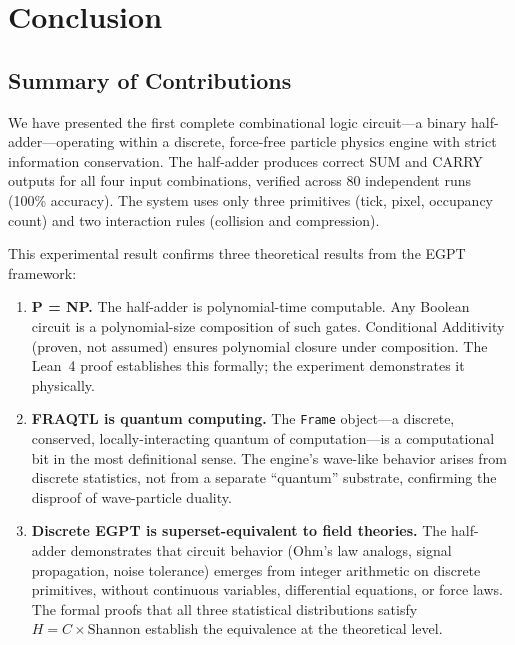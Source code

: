 \documentclass[11pt,a4paper]{article}
\begin{document}
\section{Conclusion}
\label{sec:conclusion}

\subsection{Summary of Contributions}

We have presented the first complete combinational logic circuit---a binary half-adder---operating within a discrete, force-free particle physics engine with strict information conservation. The half-adder produces correct SUM and CARRY outputs for all four input combinations, verified across 80 independent runs (100\% accuracy). The system uses only three primitives (tick, pixel, occupancy count) and two interaction rules (collision and compression).

This experimental result confirms three theoretical results from the EGPT framework:

\begin{enumerate}
    \item \textbf{P = NP.} The half-adder is polynomial-time computable. Any Boolean circuit is a polynomial-size composition of such gates. Conditional Additivity (proven, not assumed) ensures polynomial closure under composition. The Lean~4 proof establishes this formally; the experiment demonstrates it physically.

    \item \textbf{FRAQTL is quantum computing.} The \texttt{Frame} object---a discrete, conserved, locally-interacting quantum of computation---is a computational bit in the most definitional sense. The engine's wave-like behavior arises from discrete statistics, not from a separate ``quantum'' substrate, confirming the disproof of wave-particle duality.

    \item \textbf{Discrete EGPT is superset-equivalent to field theories.} The half-adder demonstrates that circuit behavior (Ohm's law analogs, signal propagation, noise tolerance) emerges from integer arithmetic on discrete primitives, without continuous variables, differential equations, or force laws. The formal proofs that all three statistical distributions satisfy $H = C \times \text{Shannon}$ establish the equivalence at the theoretical level.
\end{enumerate}
\end{document}
